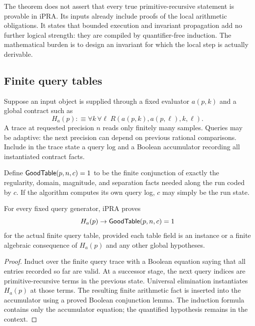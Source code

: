 \begin{remark}
The theorem does not assert that every true primitive-recursive statement is
provable in iPRA.  Its inputs already include proofs of the local arithmetic
obligations.  It states that bounded execution and invariant propagation add
no further logical strength: they are compiled by quantifier-free induction.
The mathematical burden is to design an invariant for which the local step is
actually derivable.
\end{remark}

\subsection{Finite query tables}

Suppose an input object is supplied through a fixed evaluator \(a(p,k)\) and a
global contract such as
\[
 H_a(p):\equiv\forall k\,\forall\ell\;
 R(a(p,k),a(p,\ell),k,\ell).
\]
A trace at requested precision \(n\) reads only finitely many samples.  Queries
may be adaptive: the next precision can depend on previous rational
comparisons.  Include in the trace state a query log and a Boolean accumulator
recording all instantiated contract facts.

Define \(\mathsf{GoodTable}(p,n,c)=1\) to be the finite conjunction of exactly the
regularity, domain, magnitude, and separation facts needed along the run coded
by \(c\).  If the algorithm computes its own query log, \(c\) may simply be the
run state.

\begin{lemma}
\label{lem:finite-query}
For every fixed query generator, iPRA proves
\[
 H_a(p)\to \mathsf{GoodTable}(p,n,c)=1
\]
for the actual finite query table, provided each table field is an instance or
a finite algebraic consequence of \(H_a(p)\) and any other global hypotheses.
\end{lemma}

\begin{proof}
Induct over the finite query trace with a Boolean equation saying that all
entries recorded so far are valid.  At a successor stage, the next query
indices are primitive-recursive terms in the previous state.  Universal
elimination instantiates \(H_a(p)\) at those terms.  The resulting finite
arithmetic fact is inserted into the accumulator using a proved Boolean
conjunction lemma.  The induction formula contains only the accumulator
equation; the quantified hypothesis remains in the context.
\end{proof}

